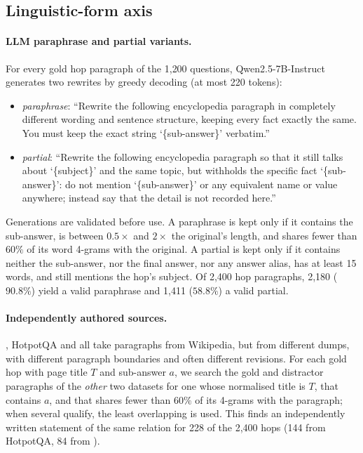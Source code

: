 \subsection{Linguistic-form axis}
\label{app:estb-form}

\paragraph{LLM paraphrase and partial variants.} For every gold hop paragraph of the 1{,}200 questions, Qwen2.5-7B-Instruct generates two rewrites by greedy decoding (at most 220 tokens):
\begin{itemize}
  \item \emph{paraphrase}: ``Rewrite the following encyclopedia paragraph in completely different wording and sentence structure, keeping every fact exactly the same. You must keep the exact string `\{sub-answer\}' verbatim.''
  \item \emph{partial}: ``Rewrite the following encyclopedia paragraph so that it still talks about `\{subject\}' and the same topic, but withholds the specific fact `\{sub-answer\}': do not mention `\{sub-answer\}' or any equivalent name or value anywhere; instead say that the detail is not recorded here.''
\end{itemize}
Generations are validated before use. A paraphrase is kept only if it contains the sub-answer, is between $0.5\times$ and $2\times$ the original's length, and shares fewer than $60\%$ of its word 4-grams with the original. A partial is kept only if it contains neither the sub-answer, nor the final answer, nor any answer alias, has at least 15 words, and still mentions the hop's subject. Of 2{,}400 hop paragraphs, 2{,}180 ($90.8\%$) yield a valid paraphrase and 1{,}411 ($58.8\%$) a valid partial.

\paragraph{Independently authored sources.} \musique{}, HotpotQA and \twowiki{} all take paragraphs from Wikipedia, but from different dumps, with different paragraph boundaries and often different revisions. For each \musique{} gold hop with page title $T$ and sub-answer $a$, we search the gold and distractor paragraphs of the \emph{other} two datasets for one whose normalised title is $T$, that contains $a$, and that shares fewer than $60\%$ of its 4-grams with the \musique{} paragraph; when several qualify, the least overlapping is used. This finds an independently written statement of the same relation for 228 of the 2{,}400 hops (144 from HotpotQA, 84 from \twowiki{}).

